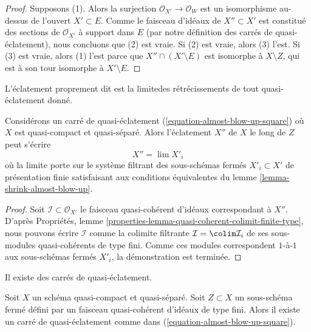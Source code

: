 \begin{proof}
Supposons (1). Alors la surjection $\mathcal{O}_{X'} \to \mathcal{O}_W$
est un isomorphisme au-dessus de l'ouvert $X' \subset E$. Comme le faisceau d'idéaux
de $X'' \subset X'$ est constitué des sections de $\mathcal{O}_{X'}$ à support dans $E$
(par notre définition des carrés de quasi-éclatement),
nous concluons que (2) est vraie. Si (2) est vraie, alors (3) l'est.
Si (3) est vraie, alors (1) l'est parce que $X'' \cap (X' \setminus E)$
est isomorphe à $X \setminus Z$, qui est à son tour isomorphe
à $X' \setminus E$.
\end{proof}

\noindent
L'éclatement proprement dit est la limite\newline des rétrécissements de tout quasi-éclatement donné.

\begin{lemma}
\label{lemma-blow-up-limit-almost-blow-up}
Considérons un carré de quasi-éclatement (\ref{equation-almost-blow-up-square})
où $X$ est quasi-compact et quasi-séparé. Alors l'éclatement $X''$ de $X$
le long de $Z$ peut s'écrire
$$
X'' = \lim X'_i
$$
où la limite porte sur le système filtrant des sous-schémas fermés
$X'_i \subset X'$ de présentation finie satisfaisant aux conditions équivalentes
du lemme \ref{lemma-shrink-almost-blow-up}.
\end{lemma}

\begin{proof}
Soit $\mathcal{I} \subset \mathcal{O}_{X'}$ le faisceau quasi-cohérent
d'idéaux correspondant à $X''$. D'après
Propriétés, lemme \ref{properties-lemma-quasi-coherent-colimit-finite-type},
nous pouvons écrire $\mathcal{I}$ comme la colimite filtrante
$\mathcal{I} = \colim \mathcal{I}_i$ de ses sous-modules quasi-cohérents
de type fini. Comme ces modules correspondent
$1$-à-$1$ aux sous-schémas fermés $X'_i$, la démonstration est terminée.
\end{proof}

\noindent
Il existe des carrés de quasi-éclatement.

\begin{lemma}
\label{lemma-almost-blow-up-square}
Soit $X$ un schéma quasi-compact et quasi-séparé. Soit $Z \subset X$
un sous-schéma fermé défini par un faisceau quasi-cohérent d'idéaux
de type fini. Alors il existe un carré de quasi-éclatement comme dans
(\ref{equation-almost-blow-up-square}).
\end{lemma}

